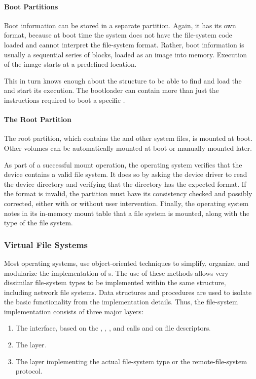 \paragraph{Boot Partitions}\label{par:Boot_Partitions}
Boot information can be stored in a separate partition.
Again, it has its own format, because at boot time the system does not have the file-system code loaded and cannot interpret the file-system format.
Rather, boot information is usually a sequential series of blocks, loaded as an image into memory.
Execution of the image starts at a predefined location.

This  in turn knows enough about the  structure to be able to find and load the  and start its execution.
The bootloader can contain more than just the instructions required to boot a specific .

\paragraph{The Root Partition}\label{par:Root_Partition}
The root partition, which contains the   and other system files, is mounted at boot.
Other volumes can be automatically mounted at boot or manually mounted later.

As part of a successful mount operation, the operating system verifies that the device contains a valid file system.
It does so by asking the device driver to read the device directory and verifying that the directory has the expected format.
If the format is invalid, the partition must have its consistency checked and possibly corrected, either with or without user intervention.
Finally, the operating system notes in its in-memory mount table that a file system is mounted, along with the type of the file system.

\subsubsection{Virtual File Systems}\label{subsubsec:Virtual_File_Systems}
Most operating systems, use object-oriented techniques to simplify, organize, and modularize the implementation of s.
The use of these methods allows very dissimilar file-system types to be implemented within the same structure, including network file systems.
Data structures and procedures are used to isolate the basic  functionality from the implementation details.
Thus, the file-system implementation consists of three major layers:
\begin{enumerate}[noitemsep]
\item The  interface, based on the , , , and  calls and on file descriptors.
\item The  layer.
\item The layer implementing the actual file-system type or the remote-file-system protocol.
\end{enumerate}

